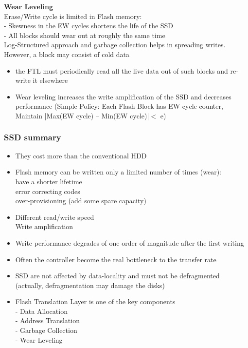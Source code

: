 \documentclass[10pt, oneside]{article}
\begin{document}
{\bf Wear Leveling}\\
Erase/Write cycle is limited in Flash memory:\\
- Skewness in the EW cycles shortens the life of the SSD\\
- All blocks should wear out at roughly the same time\\
Log-Structured approach and garbage collection helps in spreading writes. However, a block may consist of cold data 
\begin{itemize}
    \item the FTL must periodically read all the live data out of such blocks and re-write it elsewhere
    \item Wear leveling increases the write amplification of the SSD and decreases performance (Simple Policy: Each Flash Block has EW cycle counter, Maintain |Max(EW cycle) – Min(EW cycle)|$<$ e)
\end{itemize}

\subsubsection{SSD summary}
\begin{itemize}
    \item They cost more than the conventional HDD
    \item Flash memory can be written only a limited number of times (wear):\\
    have a shorter lifetime\\
    error correcting codes\\
    over-provisioning (add some spare capacity)
    \item Different read/write speed\\
    Write amplification
    \item Write performance degrades of one order of magnitude after the first writing
    \item Often the controller become the real bottleneck to the transfer rate
    \item SSD are not affected by data-locality and must not be defragmented (actually, defragmentation may damage the disks)
    \item Flash Translation Layer is one of the key components\\
    - Data Allocation\\
    - Address Translation\\
    - Garbage Collection\\
    - Wear Leveling
\end{itemize}
\end{document}

